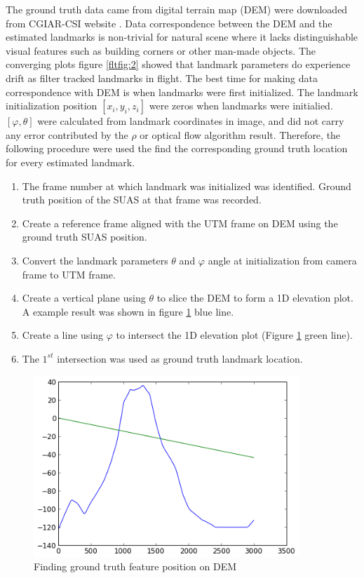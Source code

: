 The ground truth data came from digital terrain map (DEM) were
downloaded from CGIAR-CSI website \cite{_cgiar-csi_????}. Data
correspondence between the DEM and the estimated landmarks is
non-trivial for natural scene where it lacks distinguishable visual
features such as building corners or other man-made objects. The
converging plots figure \ref{fltfig:2} showed that landmark parameters
do experience drift as filter tracked landmarks in flight. The best
time for making data correspondence with DEM is when landmarks were
first initialized. The landmark initialization position $[x_i, y_i,
z_i]$ were zeros when landmarks were initialied. $[\varphi,
\theta]$ were calculated from landmark coordinates in image, and did
not carry any error contributed by the $\rho$ or optical flow
algorithm result. Therefore, the following procedure were used the find
the corresponding ground truth location for every estimated landmark.

\begin{enumerate}
  \item The frame number at which landmark was initialized was
  identified. Ground truth position of the SUAS at that frame was
  recorded.
  \item Create a reference frame aligned with the UTM frame on DEM
  using the ground truth SUAS position.
  \item Convert the landmark parameters $\theta$ and $\varphi$
  angle at initialization from camera frame to UTM frame. 
  \item Create a vertical plane using $\theta$ to slice the DEM to
  form a 1D elevation plot. A example result was shown in figure
  \ref{fltfig:7} blue line.
  \item Create a line using $\varphi$ to intersect the 1D elevation plot
  (Figure \ref{fltfig:7} green line). 
  \item The $1^{st}$ intersection was used as ground truth landmark
  location.
\end{enumerate}

\begin{figure}[h]
\centering
\includegraphics[width=10cm, keepaspectratio=true]
{./Figures/fltfig/cut1/intersect0_0.png}
\caption{Finding ground truth feature position on DEM}
\label{fltfig:7}
\end{figure}


